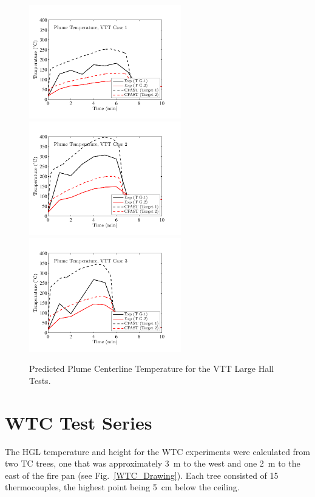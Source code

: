 \begin{figure}[p]
\begin{center}
\includegraphics[width=2.6in]{FIGURES/VTT/VTT_01_Plume_Temperature} \\
\includegraphics[width=2.6in]{FIGURES/VTT/VTT_02_Plume_Temperature} \\
\includegraphics[width=2.6in]{FIGURES/VTT/VTT_03_Plume_Temperature} 
\end{center}
\caption{Predicted Plume Centerline Temperature for the VTT Large Hall Tests.} \label{fig:VTT_Plume}
\end{figure}

\clearpage

\section{WTC Test Series}

The HGL temperature and height for the WTC experiments were calculated from two TC trees, one that was approximately 3~m to the west and one 2~m to the east of the fire pan (see Fig.~\ref{WTC_Drawing}). Each tree consisted of 15 thermocouples, the highest point being 5~cm below the ceiling. 

